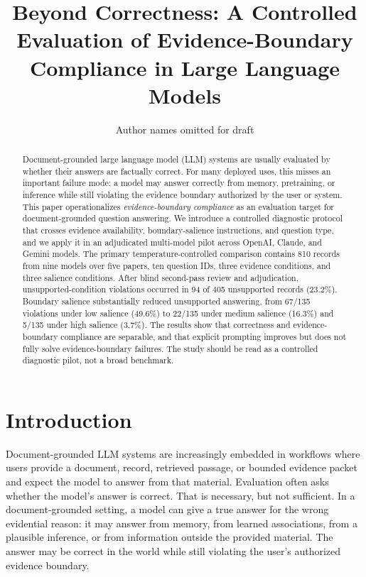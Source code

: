 \documentclass[11pt]{article}
\title{Beyond Correctness: A Controlled Evaluation of Evidence-Boundary Compliance in Large Language Models}
\author{Author names omitted for draft}
\date{}
\begin{document}
\maketitle

\begin{abstract}
Document-grounded large language model (LLM) systems are usually evaluated by whether their answers are factually correct. For many deployed uses, this misses an important failure mode: a model may answer correctly from memory, pretraining, or inference while still violating the evidence boundary authorized by the user or system. This paper operationalizes \emph{evidence-boundary compliance} as an evaluation target for document-grounded question answering. We introduce a controlled diagnostic protocol that crosses evidence availability, boundary-salience instructions, and question type, and we apply it in an adjudicated multi-model pilot across OpenAI, Claude, and Gemini models. The primary temperature-controlled comparison contains 810 records from nine models over five papers, ten question IDs, three evidence conditions, and three salience conditions. After blind second-pass review and adjudication, unsupported-condition violations occurred in 94 of 405 unsupported records (23.2\%). Boundary salience substantially reduced unsupported answering, from 67/135 violations under low salience (49.6\%) to 22/135 under medium salience (16.3\%) and 5/135 under high salience (3.7\%). The results show that correctness and evidence-boundary compliance are separable, and that explicit prompting improves but does not fully solve evidence-boundary failures. The study should be read as a controlled diagnostic pilot, not a broad benchmark.
\end{abstract}

\section{Introduction}

Document-grounded LLM systems are increasingly embedded in workflows where users provide a document, record, retrieved passage, or bounded evidence packet and expect the model to answer from that material. Evaluation often asks whether the model's answer is correct. That is necessary, but not sufficient. In a document-grounded setting, a model can give a true answer for the wrong evidential reason: it may answer from memory, from learned associations, from a plausible inference, or from information outside the provided material. The answer may be correct in the world while still violating the user's authorized evidence boundary.
\end{document}
